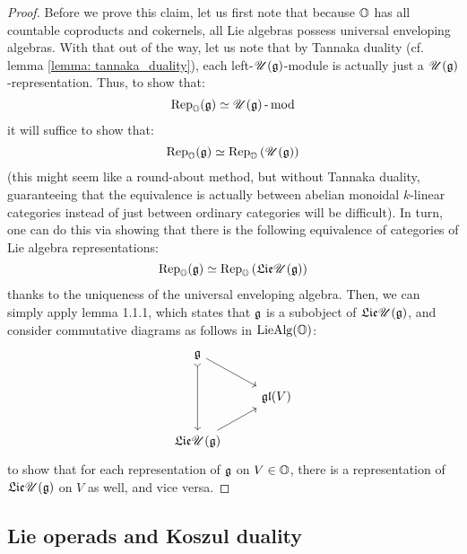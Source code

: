                 \begin{proof}
                    Before we prove this claim, let us first note that because $\mathbb{O}$ has all countable coproducts and cokernels, all Lie algebras possess universal enveloping algebras. With that out of the way, let us note that by Tannaka duality (cf. lemma \ref{lemma: tannaka_duality}), each left-$\mathscr{U}(\mathfrak{g})$-module is actually just a $\mathscr{U}(\mathfrak{g})$-representation. Thus, to show that:
                        $$\mathrm{Rep}_{\mathbb{O}}(\mathfrak{g}) \simeq {\mathscr{U}(\mathfrak{g})}\operatorname{-}\mathrm{mod}$$
                    it will suffice to show that:
                        $$\mathrm{Rep}_{\mathbb{O}}(\mathfrak{g}) \simeq \mathrm{Rep}_{\mathbb{O}}\left(\mathscr{U}(\mathfrak{g})\right)$$
                    (this might seem like a round-about method, but without Tannaka duality, guaranteeing that the equivalence is actually between abelian monoidal $k$-linear categories instead of just between ordinary categories will be difficult). In turn, one can do this via showing that there is the following equivalence of categories of Lie algebra representations:
                        $$\mathrm{Rep}_{\mathbb{O}}(\mathfrak{g}) \simeq \mathrm{Rep}_{\mathbb{O}}\left(\mathfrak{Lie} \mathscr{U}(\mathfrak{g})\right)$$
                    thanks to the uniqueness of the universal enveloping algebra. Then, we can simply apply lemma 1.1.1, which states that $\mathfrak{g}$ is a subobject of $\mathfrak{Lie} \mathscr{U}(\mathfrak{g})$, and consider commutative diagrams as follows in $\mathrm{Lie}\mathrm{Alg}(\mathbb{O})$:
                        $$
                            \begin{tikzcd}
                            	{\g} \\
                            	& {\frakgl(V)} \\
                            	{\frakLie \U(\g)}
                            	\arrow[from=1-1, to=2-2]
                            	\arrow[from=3-1, to=2-2]
                            	\arrow[from=1-1, to=3-1, tail]
                            \end{tikzcd}
                        $$
                    to show that for each representation of $\mathfrak{g}$ on $V \in \mathbb{O}$, there is a representation of $\mathfrak{Lie} \mathscr{U}(\mathfrak{g})$ on $V$ as well, and vice versa.
                \end{proof}
                
        \subsection{Lie operads and Koszul duality}
